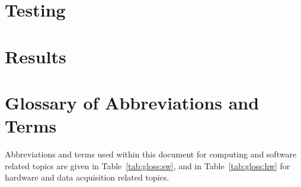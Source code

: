 \documentclass[11pt]{article}
\begin{document}
  \section{Testing}\label{sec:test}

  \section{Results}\label{sec:res}


  \newpage
  \addappheadtotoc%
  \appendix
  \appendixpage%

  \section{Glossary of Abbreviations and Terms}\label{app:glossary}

    Abbreviations and terms used within this document for computing and
    software related topics are given in Table~\ref{tab:gloss:sw}, and in
    Table~\ref{tab:gloss:hw} for hardware and data acquisition related topics.
\end{document}
